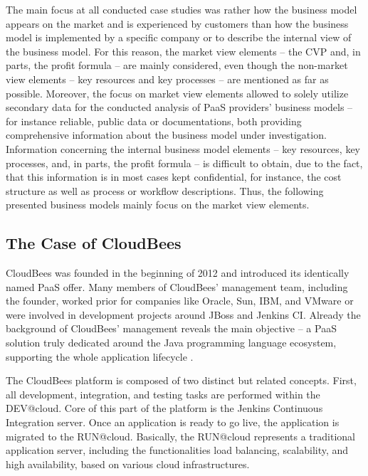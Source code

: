 The main focus at all conducted case studies was rather how the business model appears on the market and is experienced by customers than how the business model is implemented by a specific company or to describe the internal view of the business model. For this reason, the market view elements -- the \ac{CVP} and, in parts, the profit formula -- are mainly considered, even though the non-market view elements -- key resources and key processes -- are mentioned as far as possible. Moreover, the focus on market view elements allowed to solely utilize secondary data for the conducted analysis of \ac{PaaS} providers' business models -- for instance reliable, public data or documentations, both providing comprehensive information about the business model under investigation. Information concerning the internal business model elements -- key resources, key processes, and, in parts, the profit formula -- is difficult to obtain, due to the fact, that this information is in most cases kept confidential, for instance, the cost structure as well as process or workflow descriptions. Thus, the following presented business models mainly focus on the market view elements.

\subsection{The Case of CloudBees}\label{ch:sota:cb}

CloudBees was founded in the beginning of 2012 and introduced its identically named \ac{PaaS} offer. Many members of CloudBees' management team, including the founder, worked prior for companies like Oracle, Sun, IBM, and VMware or were involved in development projects around JBoss and Jenkins CI. Already the background of CloudBees' management reveals the main objective -- a \ac{PaaS} solution truly dedicated around the Java programming language ecosystem, supporting the whole application lifecycle \citep{CloudBees2013}.

The CloudBees platform is composed of two distinct but related concepts. First, all development, integration, and testing tasks are performed within the DEV@cloud. Core of this part of the platform is the Jenkins Continuous Integration server. Once an application is ready to go live, the application is migrated to the RUN@cloud. Basically, the RUN@cloud represents a traditional application server, including the functionalities load balancing, scalability, and high availability, based on various cloud infrastructures.

